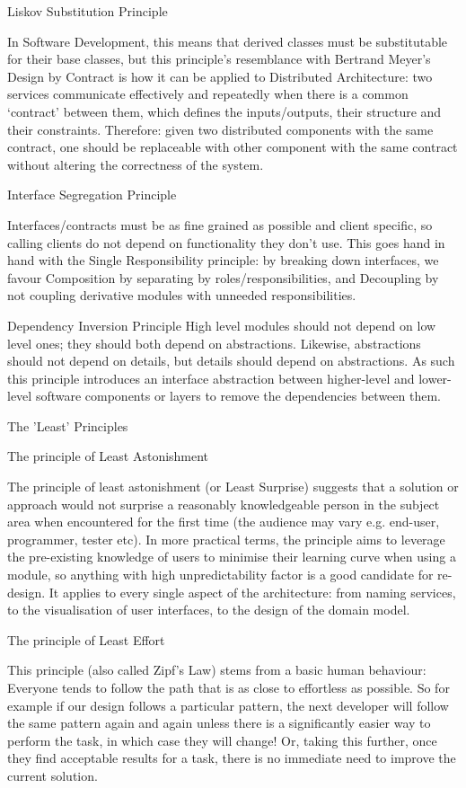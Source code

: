 Liskov Substitution Principle

In Software Development, this means that derived classes must be substitutable for their base classes, but this principle’s resemblance with Bertrand Meyer’s Design by Contract is how it can be applied to Distributed Architecture: two services communicate effectively and repeatedly when there is a common ‘contract’ between them, which defines the inputs/outputs, their structure and their constraints. Therefore: given two distributed components with the same contract, one should be replaceable with other component with the same contract without altering the correctness of the system. \cite{Baniassad2018}

Interface Segregation Principle

Interfaces/contracts must be as fine grained as possible and client specific, so calling clients do not depend on functionality they don’t use. This goes hand in hand with the Single Responsibility principle: by breaking down interfaces, we favour Composition by separating by roles/responsibilities, and Decoupling by not coupling derivative modules with unneeded responsibilities. \cite{Noback2018}

Dependency Inversion Principle
High level modules should not depend on low level ones; they should both depend on abstractions. Likewise, abstractions should not depend on details, but details should depend on abstractions. As such this principle introduces an interface abstraction between higher-level and lower-level software components or layers to remove the dependencies between them.


The ’Least’ Principles

The principle of Least Astonishment

The principle of least astonishment (or Least Surprise) \cite{Koen2019} suggests that a solution or approach would not surprise a reasonably knowledgeable person in the subject area when encountered for the first time (the audience may vary e.g. end-user, programmer, tester etc). In more practical terms, the principle aims to leverage the pre-existing knowledge of users to minimise their learning curve when using a module, so anything with high unpredictability factor is a good candidate for re-design.
It applies to every single aspect of the architecture: from naming services, to the visualisation of user interfaces, to the design of the domain model.

The principle of Least Effort

This principle (also called Zipf’s Law) \cite{Kanwal2017} stems from a basic human behaviour: Everyone tends to follow the path that is as close to effortless as possible. So for example if our design follows a particular pattern, the next developer will follow the same pattern again and again unless there is a significantly easier way to perform the task, in which case they will change! Or, taking this further, once they find acceptable results for a task, there is no immediate need to improve the current solution. 

